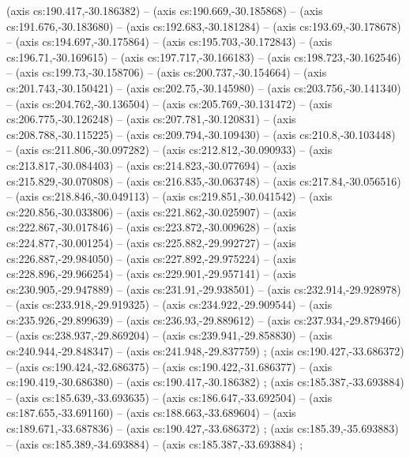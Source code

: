     (axis cs:190.417,-30.186382) --  (axis cs:190.669,-30.185868) --  (axis cs:191.676,-30.183680) --  (axis cs:192.683,-30.181284) --  (axis cs:193.69,-30.178678) --  (axis cs:194.697,-30.175864) --  (axis cs:195.703,-30.172843) --  (axis cs:196.71,-30.169615) --  (axis cs:197.717,-30.166183) --  (axis cs:198.723,-30.162546) --  (axis cs:199.73,-30.158706) --  (axis cs:200.737,-30.154664) --  (axis cs:201.743,-30.150421) --  (axis cs:202.75,-30.145980) --  (axis cs:203.756,-30.141340) --  (axis cs:204.762,-30.136504) --  (axis cs:205.769,-30.131472) --  (axis cs:206.775,-30.126248) --  (axis cs:207.781,-30.120831) --  (axis cs:208.788,-30.115225) --  (axis cs:209.794,-30.109430) --  (axis cs:210.8,-30.103448) --  (axis cs:211.806,-30.097282) --  (axis cs:212.812,-30.090933) --  (axis cs:213.817,-30.084403) --  (axis cs:214.823,-30.077694) --  (axis cs:215.829,-30.070808) --  (axis cs:216.835,-30.063748) --  (axis cs:217.84,-30.056516) --  (axis cs:218.846,-30.049113) --  (axis cs:219.851,-30.041542) --  (axis cs:220.856,-30.033806) --  (axis cs:221.862,-30.025907) --  (axis cs:222.867,-30.017846) --  (axis cs:223.872,-30.009628) --  (axis cs:224.877,-30.001254) --  (axis cs:225.882,-29.992727) --  (axis cs:226.887,-29.984050) --  (axis cs:227.892,-29.975224) --  (axis cs:228.896,-29.966254) --  (axis cs:229.901,-29.957141) --  (axis cs:230.905,-29.947889) --  (axis cs:231.91,-29.938501) --  (axis cs:232.914,-29.928978) --  (axis cs:233.918,-29.919325) --  (axis cs:234.922,-29.909544) --  (axis cs:235.926,-29.899639) --  (axis cs:236.93,-29.889612) --  (axis cs:237.934,-29.879466) --  (axis cs:238.937,-29.869204) --  (axis cs:239.941,-29.858830) --  (axis cs:240.944,-29.848347) --  (axis cs:241.948,-29.837759) ;
    (axis cs:190.427,-33.686372) --  (axis cs:190.424,-32.686375) --  (axis cs:190.422,-31.686377) --  (axis cs:190.419,-30.686380) --  (axis cs:190.417,-30.186382) ;
    (axis cs:185.387,-33.693884) --  (axis cs:185.639,-33.693635) --  (axis cs:186.647,-33.692504) --  (axis cs:187.655,-33.691160) --  (axis cs:188.663,-33.689604) --  (axis cs:189.671,-33.687836) --  (axis cs:190.427,-33.686372) ;
    (axis cs:185.39,-35.693883) --  (axis cs:185.389,-34.693884) --  (axis cs:185.387,-33.693884) ;
